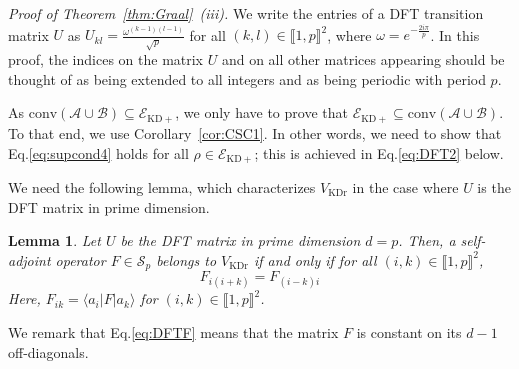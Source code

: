 \documentclass[a4paper, notitlepage, 11pt]{article}
\numberwithin{equation}{section}
\newcommand{\Acal}{{\mathcal A}}
\newcommand{\Bcal}{{\mathcal B}}
\newcommand{\EcalKDC}{{\mathcal E}_{\mathrm{KD+}}}
\newcommand{\conv}[1]{\mathrm{conv}\left(#1\right)}
\newcommand{\VR}{V_{\mathrm{KDr}}}
\renewcommand{\Im}[1]{\mathrm{Im}#1}
\newcommand{\IntEnt}[2]{\llbracket #1 , #2 \rrbracket}
\newcommand{\convAB}{\conv{\Acal \cup \Bcal}}
\newtheorem{Lemma}[Theorem]{Lemma}
\begin{document}
\noindent\emph{Proof of Theorem~\ref{thm:Graal}~(iii).}
We write the entries of a DFT transition matrix $U$ as $U_{kl}=\frac{\omega^{(k-1)(l-1)}} {\sqrt{p}}$ for all $(k,l) \in \IntEnt{1}{p}^2$, where $\omega=e^{-\frac{2i\pi}{p}}$. In this proof, the indices on the matrix $U$ and on all other matrices appearing should be thought of as being extended to all integers and as being periodic with period $p$.

As $\convAB\subseteq \EcalKDC$, we only have to prove that $\EcalKDC \subseteq \convAB$. To that end, we use Corollary~\ref{cor:CSC1}. In other words, we need to show that Eq.\eqref{eq:supcond4} holds for all $\rho\in\EcalKDC$; this is achieved in  Eq.\eqref{eq:DFT2} below. 

We need the following lemma, which characterizes $\VR$ in the case where $U$ is the DFT matrix in prime dimension.
\begin{Lemma}\label{lem:DFTLem} Let $U$ be the DFT matrix in prime dimension $d=p$. Then, a self-adjoint operator $F\in\mathcal{S}_{p}$ belongs to $\VR$ if and only if for all $(i,k)\in\IntEnt{1}{p}^2$,
\begin{equation}\label{eq:DFTF}
    F_{i (i+k)}=F_{(i-k)i}%
\end{equation}
Here, $F_{ik}=\langle a_i|F|a_k\rangle$ for $(i,k)\in\IntEnt{1}{p}^2$.
\end{Lemma}
We remark that Eq.\eqref{eq:DFTF} means that the matrix $F$ is constant on its $d-1$ off-diagonals.
\end{document}
